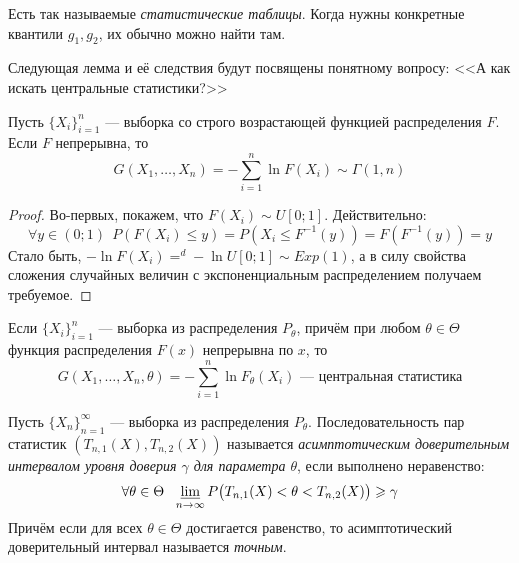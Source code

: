 \begin{note}
	Есть так называемые \textit{статистические таблицы}. Когда нужны конкретные квантили $g_1, g_2$, их обычно можно найти там.
\end{note}

\begin{note}
	Следующая лемма и её следствия будут посвящены понятному вопросу: <<А как искать центральные статистики?>>
\end{note}

\begin{lemma}
	Пусть $\{X_i\}_{i = 1}^n$ --- выборка со строго возрастающей функцией распределения $F$. Если $F$ непрерывна, то
	\[
		G(X_1, \ldots, X_n) = -\sum_{i = 1}^n \ln F(X_i) \sim \Gamma(1, n)
	\]
\end{lemma}

\begin{proof}
	Во-первых, покажем, что $F(X_i) \sim U[0; 1]$. Действительно:
	\[
		\forall y \in (0; 1)\ \ P(F(X_i) \le y) = P(X_i \le F^{-1}(y)) = F(F^{-1}(y)) = y
	\]
	Стало быть, $-\ln F(X_i) =^d -\ln U[0; 1] \sim Exp(1)$, а в силу свойства сложения случайных величин с экспоненциальным распределением получаем требуемое.
\end{proof}

\begin{corollary}
	Если $\{X_i\}_{i = 1}^n$ --- выборка из распределения $P_\theta$, причём при любом $\theta \in \Theta$ функция распределения $F(x)$ непрерывна по $x$, то
	\[
		G(X_1, \ldots, X_n, \theta) = -\sum_{i = 1}^n \ln F_\theta(X_i) \text{ --- центральная статистика}
	\]
\end{corollary}

\begin{definition}
	Пусть $\{X_n\}_{n = 1}^\infty$ --- выборка из распределения $P_\theta$. Последовательность пар статистик $(T_{n, 1}(X), T_{n, 2}(X))$ называется \textit{асимптотическим доверительным интервалом уровня доверия $\gamma$ для параметра $\theta$}, если выполнено неравенство:
	\[
		\forall \theta \in \Theta\ \ \varliminf_{n \to \infty} P\big(T_{n, 1}(X) < \theta < T_{n, 2}(X)\big) \ge \gamma
	\]
	Причём если для всех $\theta \in \Theta$ достигается равенство, то асимптотический доверительный интервал называется \textit{точным}.
\end{definition}

